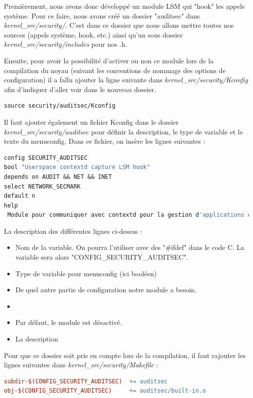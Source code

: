 \documentclass[pdftex,a4paper,titlepage,11pt]{article}
\begin{document}
Premièrement, nous avons donc développé un module LSM qui "hook" les appels système. Pour ce faire, nous avons créé un dossier "auditsec" dans \textit{{kernel\_src}/security/}. C'est dans ce dossier que nous allons mettre toutes nos sources (appels système, hook, etc.) ainsi qu'un sous dossier \textit{{kernel\_src}/security/includes} pour nos .h.  

Ensuite,  pour avoir la possibilité d'activer ou non ce module lors de la compilation du noyau (suivant les conventions de nommage des options de configuration) il a fallu ajouter la ligne suivante dans \textit{{kernel\_src}/security/Kconfig} afin d'indiquer d'aller voir dans le nouveau dossier.


\begin{lstlisting}[language=make]
source security/auditsec/Kconfig
\end{lstlisting}

Il faut ajouter également un fichier Kconfig dans le dossier \textit{{kernel\_src}/security/auditsec} pour définir la description, le type de variable et le texte du menuconfig. Dans ce fichier, on insère les lignes suivantes :

\begin{lstlisting}[language=make]
config SECURITY_AUDITSEC
bool "Userspace contextd capture LSM hook"
depends on AUDIT && NET && INET
select NETWORK_SECMARK
default n
help
 Module pour communiquer avec contextd pour la gestion d'applications en userspace.
\end{lstlisting}

La description des différentes lignes ci-dessus :
\begin{itemize}
	\item Nom de la variable. On pourra l'utiliser avec des "\#ifdef" dans le code C. La variable sera alors "CONFIG\_SECURITY\_AUDITSEC".
	\item Type de variable pour menuconfig (ici booléen)
	\item De quel autre partie de configuration notre module a besoin.
	\item
	\item Par défaut, le module est désactivé.
	\item La description
\end{itemize}

 Pour que ce dossier soit pris en compte lors de la compilation, il faut rajouter les lignes suivantes dans \textit{{kernel\_src}/security/Makefile} :

\begin{lstlisting}[language=make]
subdir-$(CONFIG_SECURITY_AUDITSEC)  += auditsec	
obj-$(CONFIG_SECURITY_AUDITSEC)     += auditsec/built-in.o
\end{lstlisting}
\end{document}
